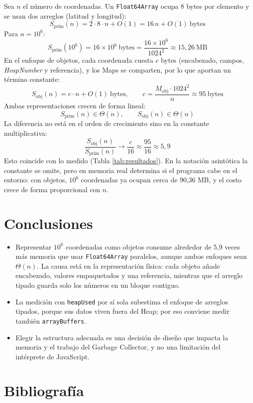 \documentclass[11pt]{article}
\newcommand{\mObj}{90{,}36}       %
\newcommand{\cObj}{95}            %
\newcommand{\razon}{5{,}9}        %
\begin{document}
Sea $n$ el número de coordenadas. Un \texttt{Float64Array} ocupa 8 bytes por elemento y se usan dos arreglos (latitud y longitud):
\begin{equation}
    S_{\text{prim}}(n) = 2 \cdot 8 \cdot n + O(1) = 16\,n + O(1) \ \text{bytes}
\end{equation}
Para $n = 10^6$:
\begin{equation}
    S_{\text{prim}}(10^6) = 16 \times 10^6 \ \text{bytes} = \frac{16 \times 10^6}{1024^2} \approx 15{,}26 \ \text{MB}
\end{equation}
En el enfoque de objetos, cada coordenada cuesta $c$ bytes (encabezado, campos, \textit{HeapNumber} y referencia), y los Maps se comparten, por lo que aportan un término constante:
\begin{equation}
    S_{\text{obj}}(n) = c \cdot n + O(1) \ \text{bytes}, \qquad c = \frac{M_{\text{obj}} \cdot 1024^2}{n} \approx \cObj \ \text{bytes}
\end{equation}
Ambas representaciones crecen de forma lineal:
\begin{equation}
    S_{\text{prim}}(n) \in \Theta(n), \qquad S_{\text{obj}}(n) \in \Theta(n)
\end{equation}
La diferencia no está en el orden de crecimiento sino en la constante multiplicativa:
\begin{equation}
    \frac{S_{\text{obj}}(n)}{S_{\text{prim}}(n)} \longrightarrow \frac{c}{16} \approx \frac{\cObj}{16} \approx \razon
\end{equation}
Esto coincide con lo medido (Tabla \ref{tab:resultados}). En la notación asintótica la constante se omite, pero en memoria real determina si el programa cabe en el entorno: con objetos, $10^6$ coordenadas ya ocupan cerca de \mObj{} MB, y el costo crece de forma proporcional con $n$.

\section{Conclusiones}

\begin{itemize}[leftmargin=*]
\item
    Representar $10^6$ coordenadas como objetos consume alrededor de \razon{} veces más memoria que usar \texttt{Float64Array} paralelos, aunque ambos enfoques sean $\Theta(n)$. La causa está en la representación física: cada objeto añade encabezado, valores empaquetados y una referencia, mientras que el arreglo tipado guarda solo los números en un bloque contiguo.

\item
    La medición con \texttt{heapUsed} por sí sola subestima el enfoque de arreglos tipados, porque sus datos viven fuera del Heap; por eso conviene medir también \texttt{arrayBuffers}.

\item
    Elegir la estructura adecuada es una decisión de diseño que impacta la memoria y el trabajo del Garbage Collector, y no una limitación del intérprete de JavaScript.
\end{itemize}

\section{Bibliografía}

\printbibliography[heading=none]
\end{document}
